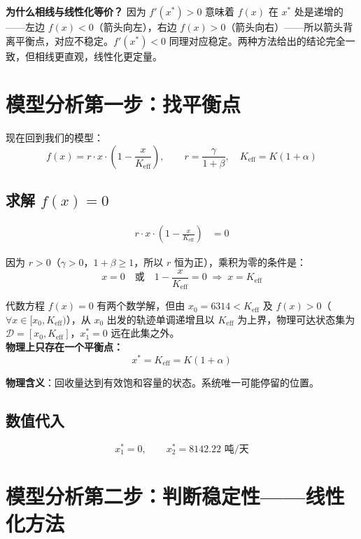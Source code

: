 \documentclass[12pt,a4paper]{article}
\begin{document}
\textbf{为什么相线与线性化等价？} 因为 $f'(x^*) > 0$ 意味着 $f(x)$ 在 $x^*$ 处是递增的——左边 $f(x) < 0$（箭头向左），右边 $f(x) > 0$（箭头向右）——所以箭头背离平衡点，对应不稳定。$f'(x^*) < 0$ 同理对应稳定。两种方法给出的结论完全一致，但相线更直观，线性化更定量。

\section{模型分析第一步：找平衡点}

现在回到我们的模型：
\[
f(x) = r \cdot x \cdot \left(1 - \frac{x}{K_{\text{eff}}}\right), \qquad r = \frac{\gamma}{1+\beta}, \quad K_{\text{eff}} = K(1+\alpha)
\]

\subsection{求解 $f(x) = 0$}

\begin{align*}
r \cdot x \cdot \left(1 - \frac{x}{K_{\text{eff}}}\right) &= 0
\end{align*}

因为 $r > 0$（$\gamma > 0$，$1+\beta \geq 1$，所以 $r$ 恒为正），乘积为零的条件是：
\[
x = 0 \quad \text{或} \quad 1 - \frac{x}{K_{\text{eff}}} = 0 \;\Rightarrow\; x = K_{\text{eff}}
\]

代数方程 $f(x) = 0$ 有两个数学解，但由 $x_0 = 6314 < K_{\text{eff}}$ 及 $f(x) > 0$（$\forall x \in [x_0, K_{\text{eff}})$），从 $x_0$ 出发的轨迹单调递增且以 $K_{\text{eff}}$ 为上界，物理可达状态集为 $\mathcal{D} = [x_0, K_{\text{eff}}]$，$x_1^* = 0$ 远在此集之外。\\
\textbf{物理上只存在一个平衡点：}
\begin{equation}\label{eq:equilibria}
\boxed{x^* = K_{\text{eff}} = K(1+\alpha)}
\end{equation}

\textbf{物理含义}：回收量达到有效饱和容量的状态。系统唯一可能停留的位置。

\subsection*{数值代入}
\[
x_1^* = 0, \qquad x_2^* = 8142.22 \text{ 吨/天}
\]

\section{模型分析第二步：判断稳定性——线性化方法}
\end{document}
